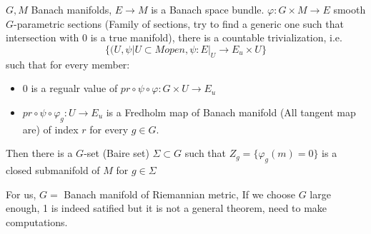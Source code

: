 \documentclass{amsart}
\begin{document}
\begin{prop}
$G,M$ Banach manifolds, $E\to M$ is a Banach space bundle. $\varphi:G\times M\to E$ smooth $G$-parametric sections (Family of sections, try to find a generic one such that intersection with $0$ is a true manifold), there is a countable trivialization, i.e.
\[
\{(U,\psi|U\subset M open, \psi:E|_{U}\to E_u\times U\}
\]
such that for every member:
\begin{itemize}
\item $0$ is a regualr value of $pr\circ\psi\circ\varphi:G\times U\to E_u$
\item $pr\circ\psi\circ\varphi_g:U\to E_u$ is a Fredholm map of Banach manifold (All tangent map are) of index $r$ for every $g\in G$.

\end{itemize}

Then there is a $G$-set (Baire set) $\Sigma\subset G$ such that $Z_g=\{\varphi_g(m)=0\}$ is a closed submanifold of $M$ for $g\in\Sigma$ 

For us, $G=$ Banach manifold of Riemannian metric, If we choose $G$ large enough, 1 is indeed satified but it is not a general theorem, need to make computations.





\end{prop} 
\end{document}
